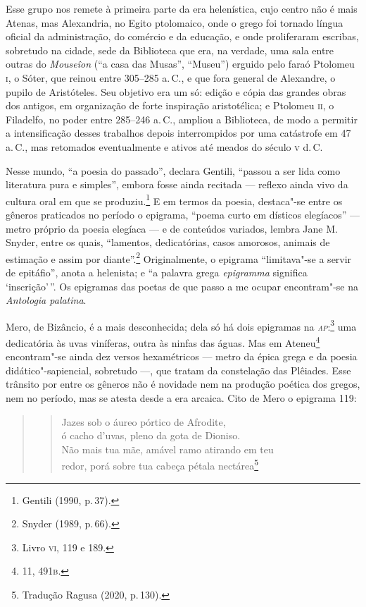Esse grupo nos remete à primeira parte da era helenística, cujo centro não é
mais Atenas, mas Alexandria, no Egito ptolomaico, onde o grego foi tornado
língua oficial da administração, do comércio e da educação, e onde proliferaram
escribas, sobretudo na cidade, sede da Biblioteca que era, na
verdade, uma sala entre outras do \emph{Mouseîon} (“a casa das Musas”,
“Museu”) erguido pelo faraó Ptolomeu \textsc{i}, o Sóter, que reinou entre 305--285 a.\,C.,
e que fora general de Alexandre, o pupilo de Aristóteles. Seu objetivo era um
só: edição e cópia das grandes obras dos antigos, em organização de forte
inspiração aristotélica; e Ptolomeu \textsc{ii}, o Filadelfo, no poder entre 285--246
a.\,C., ampliou a Biblioteca, de modo a permitir a intensificação desses
trabalhos depois interrompidos por uma catástrofe em 47 a.\,C., mas retomados
eventualmente e ativos até meados do século \textsc{v} d.\,C. 

Nesse mundo, “a poesia do passado”, declara Gentili, “passou a
ser lida como literatura pura e simples”, embora fosse ainda recitada --- reflexo
ainda vivo da cultura oral em que se produziu.\footnote{ Gentili (1990, p.\,37).} E em termos da poesia,
destaca"-se entre os gêneros praticados no período o epigrama, “poema curto em
dísticos elegíacos” --- metro próprio da poesia elegíaca --- e de conteúdos
variados, lembra Jane M. Snyder, entre os quais, “lamentos,
dedicatórias, casos amorosos, animais de estimação e assim por diante”.\footnote{ Snyder (1989, p.\,66).}
Originalmente, o epigrama “limitava"-se a servir de epitáfio”, anota a
helenista; e “a palavra grega \emph{epigramma} significa ‘inscrição’\,”. Os
epigramas das poetas de que passo a me ocupar encontram"-se na \emph{Antologia
palatina}.

Mero, de Bizâncio, é a mais desconhecida; dela só há dois epigramas na \emph{\textsc{ap}}:\footnote{Livro \textsc{vi}, 119 e 189.} uma dedicatória às uvas viníferas,
outra às ninfas das águas. Mas em Ateneu\footnote{11, 491\textsc{b}.} encontram"-se ainda dez
versos hexamétricos --- metro da épica grega e da poesia didático"-sapiencial,
sobretudo ---, que tratam da constelação das Plêiades. Esse trânsito por entre os
gêneros não é novidade nem na produção poética dos gregos, nem no período, mas
se atesta desde a era arcaica.
Cito de Mero o epigrama 119:

\begin{quote}
\begin{verse}
Jazes sob o áureo pórtico de Afrodite,\\
ó cacho d'uvas, pleno da gota de Dioniso.\\
Não mais tua mãe, amável ramo atirando em teu\\
redor, porá sobre tua cabeça pétala nectárea\footnote{Tradução Ragusa (2020, p.\,130).}
\end{verse}
\end{quote}

